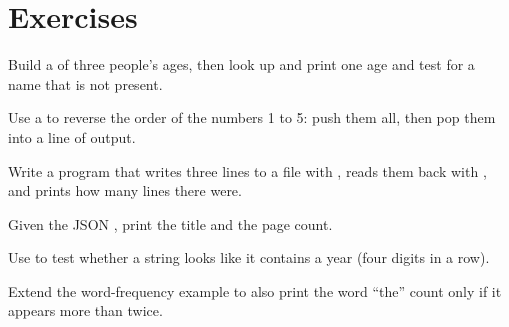 \section{Exercises}

\exercise Build a  of three people's ages, then look up and
print one age and test for a name that is not present.

\exercise Use a  to reverse the order of the numbers 1 to 5: push them
all, then pop them into a line of output.

\exercise Write a program that writes three lines to a file with
, reads them back with , and prints how many
lines there were.

\exercise Given the JSON , print the title and the page count.

\exercise Use  to test whether a string looks like it contains
a year (four digits in a row).

\exercise Extend the word-frequency example to also print the word ``the'' count
only if it appears more than twice.
